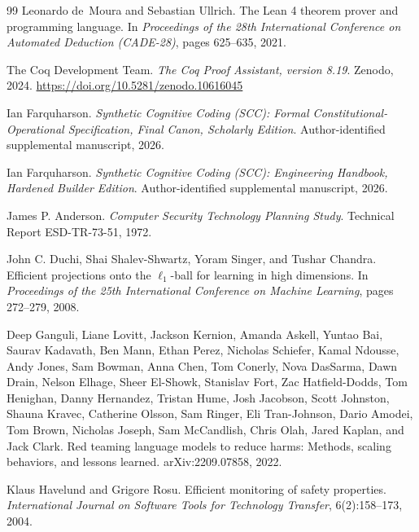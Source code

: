 \documentclass{article}
\begin{document}
\begin{thebibliography}{99}
Leonardo de~Moura and Sebastian Ullrich.
The {Lean 4} theorem prover and programming language.
In \emph{Proceedings of the 28th International Conference on Automated Deduction (CADE-28)}, pages 625--635, 2021.

{The Coq Development Team}.
\emph{The {Coq} Proof Assistant, version 8.19}.
Zenodo, 2024. \url{https://doi.org/10.5281/zenodo.10616045}

Ian Farquharson. \emph{Synthetic Cognitive Coding (SCC): Formal Constitutional-Operational Specification, Final Canon, Scholarly Edition}. Author-identified supplemental manuscript, 2026.

Ian Farquharson. \emph{Synthetic Cognitive Coding (SCC): Engineering Handbook, Hardened Builder Edition}. Author-identified supplemental manuscript, 2026.

James P. Anderson. \emph{Computer Security Technology Planning Study}. Technical Report ESD-TR-73-51, 1972.

John C. Duchi, Shai Shalev-Shwartz, Yoram Singer, and Tushar Chandra. Efficient projections onto the $\ell_1$-ball for learning in high dimensions. In \emph{Proceedings of the 25th International Conference on Machine Learning}, pages 272--279, 2008.

Deep Ganguli, Liane Lovitt, Jackson Kernion, Amanda Askell, Yuntao Bai, Saurav Kadavath, Ben Mann, Ethan Perez, Nicholas Schiefer, Kamal Ndousse, Andy Jones, Sam Bowman, Anna Chen, Tom Conerly, Nova DasSarma, Dawn Drain, Nelson Elhage, Sheer El-Showk, Stanislav Fort, Zac Hatfield-Dodds, Tom Henighan, Danny Hernandez, Tristan Hume, Josh Jacobson, Scott Johnston, Shauna Kravec, Catherine Olsson, Sam Ringer, Eli Tran-Johnson, Dario Amodei, Tom Brown, Nicholas Joseph, Sam McCandlish, Chris Olah, Jared Kaplan, and Jack Clark. Red teaming language models to reduce harms: Methods, scaling behaviors, and lessons learned. arXiv:2209.07858, 2022.

Klaus Havelund and Grigore Rosu. Efficient monitoring of safety properties. \emph{International Journal on Software Tools for Technology Transfer}, 6(2):158--173, 2004.


\end{thebibliography}
\end{document}
